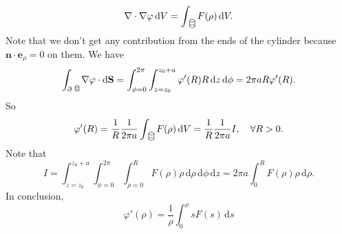 \begin{example}
\[{\begin{tikzpicture}[scale=0.5]
        \end{tikzpicture}} \div \nabla \varphi \,\mathrm{d}V = \int_{~\begin{tikzpicture}[scale=0.5]
            \draw (0,0.1) ellipse (0.2 and 0.1);
            \draw (0,-0.3) ellipse (0.2 and 0.1);
            \draw (-0.2,0.1) -- (-0.2,-0.3);
            \draw (0.2,0.1) -- (0.2,-0.3); 
        \end{tikzpicture}} F(\rho) \,\mathrm{d}V.
    \]
    Note that we don't get any contribution from the ends of the cylinder because $\mathbf{n} \cdot \mathbf{e}_{\rho}=0$ on them. We have 
    \[
        \int_{\partial ~\begin{tikzpicture}[scale=0.35]
            \draw (0,0.1) ellipse (0.2 and 0.1);
            \draw (0,-0.3) ellipse (0.2 and 0.1);
            \draw (-0.2,0.1) -- (-0.2,-0.3);
            \draw (0.2,0.1) -- (0.2,-0.3); 
        \end{tikzpicture}} \nabla \varphi \cdot\mathrm{d}\mathbf{S}=\int_{\phi=0}^{2\pi} \int_{z=z_0}^{z_0+a} \varphi'(R)R \,\mathrm{d}z \,\mathrm{d}\phi = 2\pi a R \varphi'(R).
    \]
    So 
    \[
        \varphi'(R)=\frac{1}{R}\frac{1}{2\pi a}\int_{~\begin{tikzpicture}[scale=0.5]
            \draw (0,0.1) ellipse (0.2 and 0.1);
            \draw (0,-0.3) ellipse (0.2 and 0.1);
            \draw (-0.2,0.1) -- (-0.2,-0.3);
            \draw (0.2,0.1) -- (0.2,-0.3); 
        \end{tikzpicture}} F(\rho) \,\mathrm{d}V=\frac{1}{R}\frac{1}{2\pi a} I,\quad \forall R>0.
    \]
    Note that 
    \[
        I = \int_{z=z_0}^{z_0+a} \int_{\phi=0}^{2\pi} \int_{\rho=0}^{R} F(\rho)\rho \,\mathrm{d}\rho \,\mathrm{d}\phi \,\mathrm{d}z = 2\pi a \int_{0}^{R} F(\rho)\rho \,\mathrm{d}\rho.
    \]
    In conclusion, 
    \[
        \boxed{\varphi'(\rho)=\frac{1}{\rho}\int_{0}^{\rho} sF(s) \,\mathrm{d}s}
    \]
\end{example}

